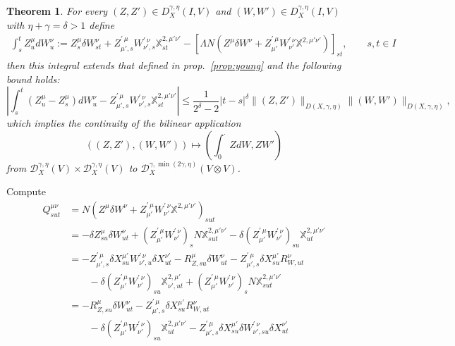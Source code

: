 \documentclass[a4paper,12pt,reqno]{amsproc}
\newcommand{\der}{\delta\!}
\newcommand{\NN}{N}
\newcommand{\DD}{\mathcal{D}}
\newtheorem{theorem}{Theorem}
\begin{document}
\begin{theorem}
 \label{th:rough}
For every $(Z,Z') \in D_X^{\gamma,\eta}(I,V)$ and $(W,W') \in
D_X^{\gamma,\eta}(I,V)$ with $\eta+\gamma = \delta >1$ define
\begin{equation}
  \label{eq:rough-definition}
  \begin{split}
  \int_s^t Z^\mu_{u} dW^\nu_u  := Z^\mu_{s} \der W^\nu_{st} + Z^{\prime\,\mu}_{\mu',s}
  W^{\prime\,\nu}_{\nu',s} \mathbb{X}^{2,\mu'\nu'}_{st} - [\Lambda \NN (Z^\mu \der W^\nu +
   Z^{\prime\,\mu}_{\mu'} W^{\prime\,\nu}_{\nu'}
  \mathbb{X}^{2,\mu'\nu'} ) ]_{st}, \qquad s,t \in I     
  \end{split}
\end{equation}
then this integral extends that defined in prop.~\ref{prop:young} and
the following bound holds:
\begin{equation}
  \label{eq:rough-bound}
  \left| \int_s^t (Z^\mu_u-Z^\mu_s) dW^\nu_u - Z^{\prime\,\mu}_{\mu',s} W^{\prime\,\nu}_{\nu',s} \mathbb{X}^{2,\mu'\nu'}_{st} \right| \le \frac{1}{2^{\delta}-2}
  |t-s|^{\delta} \|(Z,Z')\|_{D(X,\gamma,\eta)} \|(W,W')\|_{D(X,\gamma,\eta)},
\end{equation}
which implies the continuity of the bilinear application
$$
((Z,Z'),(W,W')) \mapsto \left(\int_0^\cdot Z dW,Z W'\right) 
$$
from $\DD_X^{\gamma,\eta}(V)\times \DD_X^{\gamma,\eta}(V)$ to
$\DD_X^{\gamma,\min(2\gamma,\eta)}(V\otimes V)$.
\end{theorem}
\proof
Compute
\begin{equation*}
  \begin{split}
  Q^{\mu\nu}_{sut} & = \NN (Z^\mu \der W^\nu +
  Z^{\prime\,\mu}_{\mu'} W^{\prime\,\nu}_{\nu'} \mathbb{X}^{2,\mu'\nu'})_{sut} 
\\ & = - \der Z^\mu_{su}\der W^\nu_{ut} + (Z^{\prime\,\mu}_{\mu'}
  W^{\prime\,\nu}_{\nu'})_s N \mathbb{X}^{2,\mu'\nu'}_{sut} -
   \der(Z^{\prime\,\mu}_{\mu'} W^{\prime\,\nu}_{\nu'})_{su} \mathbb{X}^{2,\mu'\nu'}_{ut}
\\ &= - Z^{\prime\,\mu}_{\mu',s} \der X^{\mu'}_{su}  
  W^{\prime\,\nu}_{\nu',u} \der X^{\nu'}_{ut} - R^\mu_{Z,su} \der
  W^\nu_{ut} - Z^{\prime\,\mu}_{\mu',s} \der X^{\mu'}_{su}
  R^\nu_{W,ut} \\ & \qquad  - 
   \der(Z^{\prime\,\mu}_{\mu'} W^{\prime\,\nu}_{\nu'})_{su}
  \mathbb{X}^{2,\mu'}_{\nu',ut}
 +  (Z^{\prime\,\mu}_{\mu'} W^{\prime\,\nu}_{\nu'})_s  N \mathbb{X}^{2,\mu'\nu'}_{sut} 
\\ &=  - R^\mu_{Z,su} \der W^\nu_{ut} - Z^{\prime\,\mu}_{\mu',s}\der X^{\mu'}_{su}
  R^\nu_{W,ut}\\ & \qquad  - 
  \der(Z^{\prime\,\mu}_{\mu'} W^{\prime\,\nu}_{\nu'})_{su} \mathbb{X}^{2,\mu'\nu'}_{ut} 
- Z^{\prime\,\mu}_{\mu',s} \der X^{\mu'}_{su}
  \der W^{\prime\,\nu}_{\nu',su} \der X^{\nu'}_{ut}
  \end{split}
\end{equation*}
\end{document}
